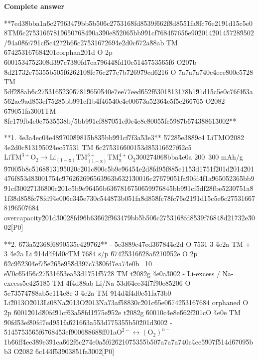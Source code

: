 \documentclass[10pt]{article}
\begin{document}
\textbf{Complete answer}
\begin{AnswerText}
**\u7ed3\u8bba\uff1a\u6c27\u9634\u79bb\u5b50\u6c27\u5316\u8fd8\u539f\u662f\u8d85\u51fa\u8fc7\u6e21\u91d1\u5c5e\uff08TM\u6c27\u5316\u6781\u9650\u7684\u90a3\u90e8\u5206\u5bb9\u91cf\u7684\u6765\u6e90\u2014\u2014\u5728\u9502/\u94a0\u8fc7\u91cf\u5c42\u72b6\u6c27\u5316\u7269\u4e2d\uff0c\u672a\u88ab TM \u6742\u5316\u7684\u201corphan\u201d O 2p \u6001\u5347\u5230\u8d39\u7c73\u80fd\u7ea7\u9644\u8fd1\uff0c\u5145\u7535\u65f6 O\u207b \u8d21\u732e\u7535\u5b50\u5f62\u6210\u8fc7\u6c27\u7c7b\u7269\u79cd\u6216 O \u7a7a\u7a74\uff0c\u4ece\u800c\u5728 TM \u5df2\u88ab\u6c27\u5316\u5230\u6781\u9650\u540e\u7ee7\u7eed\u652f\u6301\u8131\u78b1\u91d1\u5c5e\uff0c\u76f4\u63a5\u62ac\u9ad8\u53ef\u7528\u5bb9\u91cf\uff1b\u4f46\u540c\u4e00\u673a\u5236\u4e5f\u5e26\u6765 O\u2082 \u6790\u51fa\u3001TM \u8fc1\u79fb\u4e0e\u7535\u538b/\u5bb9\u91cf\u8870\u51cf\uff0c\u4e8c\u8005\u5fc5\u987b\u6743\u8861\u3002**

**1. \u4e3a\u4ec0\u4e48\u9700\u8981\u5b83\u5bb9\u91cf\u7f3a\u53e3**
\u5728\u5e38\u89c4 LiTMO\u2082 \u4e2d\uff0c\u8131\u9502\u4ec5\u7531 TM \u6c27\u5316\u6001\u53d8\u5316\u627f\u62c5$\mathrm{LiTM^{3+}O_2 \to Li_{(1-x)}TM_{(1-x)}^{3+}TM_x^{4+}O_2}$\u3002\u7406\u8bba\u4e0a 200~300 mAh/g \u9700\u5b8c\u5168\u8131\u9502\uff0c\u201c\u800c\u5b9e\u9645\u4e2d\u8fd9\u5f88\u5c11\u53d1\u751f\u201d\u2014\u2014\u76f8\u53d8\u3001\u754c\u9762\u6269\u6563\u963b\u6321\u3001\u6c27\u6790\u51fa\u90fd\u4f1a\u9650\u5236\u5bb9\u91cf\u3002\u7136\u800c\u201c\u5b9e\u9645\u6b63\u6781\u6750\u6599\u7684\u5bb9\u91cf\u5df2\u8fbe\u5230\u751a\u81f3\u8d85\u8fc7\u8fd9\u4e00\u6c34\u5e73\uff0c\u5448\u73b0\u51fa\u8d85\u8fc7\u8fc7\u6e21\u91d1\u5c5e\u6c27\u5316\u6781\u9650\u7684 overcapacity\u201d\u3002\u8fd9\u6b63\u662f\u9634\u79bb\u5b50\u6c27\u5316\u8fd8\u539f\u7684\u8d21\u732e\u3002[P0]

**2. \u673a\u5236\u8f68\u9053\u5c42\u9762**
- \u5e38\u89c4\u7ed3\u6784\u4e2d O \u7531 3 \u4e2a TM + 3 \u4e2a Li \u914d\u4f4d\uff0cTM \u7684 s/p \u6742\u5316\u628a\u6210\u952e O 2p \u62c9\u5230\u4ef7\u5e26\u5e95\u8d39\u7c73\u80fd\u7ea7\u4e0b ~10 eV\uff0c\u6545\u6c27\u5316\u53ea\u53d1\u751f\u5728 TM t\u2082g \u4e0a\u3002
- Li-excess / Na-excess\u5c42\u5185 TM \u4f4d\u88ab Li/Na \u53d6\u4ee3\u4f7f\u90e8\u5206 O \u5e73\u5747\u88ab\u5c11\u4e8e 3 \u4e2a TM \u914d\u4f4d\uff0c\u51fa\u73b0 Li\u2013O\u2013Li\uff08Na\u2013O\u2013Na\u73af\u5883\uff0c\u201c\u65e0\u6742\u5316\u7684 orphaned O 2p \u6001\u201d\u80fd\u91cf\u63a5\u8fd1\u975e\u952e t\u2082g \u6001\uff0c\u4e8e\u662f\u201cO \u4e0e TM \u90fd\u53ef\u80fd\u7ed9\u51fa\u6216\u63a5\u53d7\u7535\u5b50\u201d\u3002
- \u5145\u7535\u65f6\u7684\u53ef\u9006\u8868\u8ff0\uff1a$\mathrm{O^{2-} \leftrightarrow (O_2)^{n-}}$\uff1b\u66ff\u4ee3\u89e3\u91ca\u662f\u6c27\u4e0a\u5f62\u6210\u7535\u5b50\u7a7a\u7a74\uff0c\u4ee5\u907f\u514d\u6709\u5bb3 O\u2082 \u6c14\u4f53\u9038\u51fa\u3002[P0]


\end{AnswerText}
\end{document}
